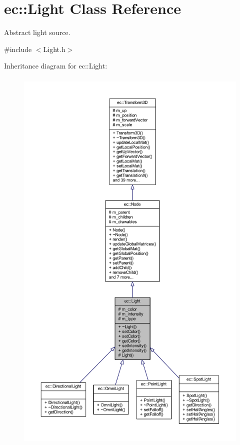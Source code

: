 \hypertarget{classec_1_1_light}{}\section{ec\+:\+:Light Class Reference}
\label{classec_1_1_light}


Abstract light source.  




{\ttfamily \#include $<$Light.\+h$>$}



Inheritance diagram for ec\+:\+:Light\+:\nopagebreak
\begin{figure}[H]
\begin{center}
\leavevmode
\includegraphics[height=550pt]{classec_1_1_light__inherit__graph}
\end{center}
\end{figure}


